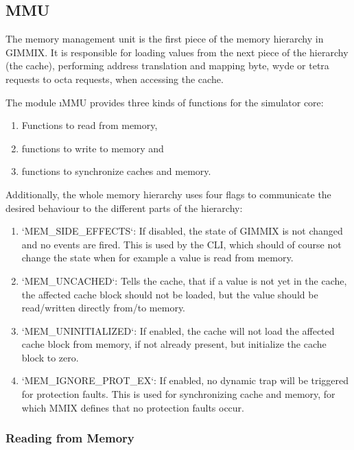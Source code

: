 \subsection{MMU}

The memory management unit is the first piece of the memory hierarchy in GIMMIX. It is responsible for loading values from the next piece of the hierarchy (the cache), performing address translation and mapping byte, wyde or tetra requests to octa requests, when accessing the cache.

The module \i{MMU} provides three kinds of functions for the simulator core:
\begin{enumerate}
	\item Functions to read from memory,
	\item functions to write to memory and
	\item functions to synchronize caches and memory.
\end{enumerate}
Additionally, the whole memory hierarchy uses four flags to communicate the desired behaviour to the different parts of the hierarchy:
\begin{enumerate}
	\item `MEM_SIDE_EFFECTS`: If disabled, the state of GIMMIX is not changed and no events are fired. This is used by the CLI, which should of course not change the state when for example a value is read from memory.
	\item `MEM_UNCACHED`: Tells the cache, that if a value is not yet in the cache, the affected cache block should not be loaded, but the value should be read/written directly from/to memory.
	\item `MEM_UNINITIALIZED`: If enabled, the cache will not load the affected cache block from memory, if not already present, but initialize the cache block to zero.
	\item `MEM_IGNORE_PROT_EX`: If enabled, no dynamic trap will be triggered for protection faults. This is used for synchronizing cache and memory, for which MMIX defines that no protection faults occur.
\end{enumerate}

\subsubsection{Reading from Memory}

